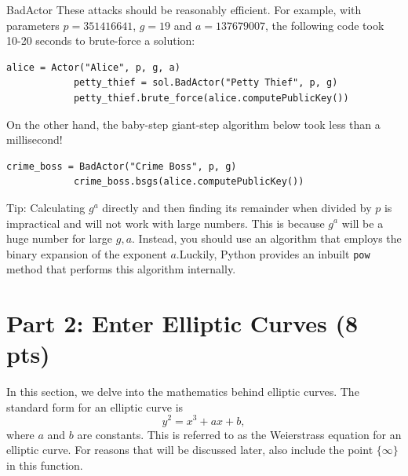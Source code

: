 \documentclass{article}
\begin{document}
\begin{tcolorbox}[enhanced,interior style={top color=Plum!20,bottom color=Plum!30}]
\begin{mybox}[
            colframe=purple!50!black,
            colback=purple!30,
            colbacktitle=purple!50!white,
            coltitle=purple!30!black,
            ]{BadActor}
        These attacks should be reasonably efficient. For example, with parameters $p = 351416641$, $g = 19$ and $a = 137679007$, the following code took 10-20 seconds to brute-force a solution:
        \begin{lstlisting}[belowskip=-6pt]
            alice = Actor("Alice", p, g, a)
            petty_thief = sol.BadActor("Petty Thief", p, g)
            petty_thief.brute_force(alice.computePublicKey())
        \end{lstlisting}
        On the other hand, the baby-step giant-step algorithm below took less than a millisecond!
        \begin{lstlisting}[belowskip=-10pt]
            crime_boss = BadActor("Crime Boss", p, g)
            crime_boss.bsgs(alice.computePublicKey())
        \end{lstlisting}
        
        \end{mybox}
    
        \vspace{2mm}
        Tip: Calculating $g^{a}$ directly and then finding its remainder when divided by $p$ is impractical and will not work with large numbers. This is because $g^{a}$ will be a huge number for large $g, a$. Instead, you should use an algorithm that employs the binary expansion of the exponent $a$.\footnotemark Luckily, Python provides an inbuilt \lstinline{pow} method that performs this algorithm internally.
    \end{tcolorbox}

\section*{Part 2: Enter Elliptic Curves (8 pts)}
    In this section, we delve into the mathematics behind elliptic curves. The standard form for an elliptic curve is $$y^{2} = x^{3} + ax + b,$$ where $a$ and $b$ are constants. This is referred to as the Weierstrass equation for an elliptic curve. For reasons that will be discussed later, also include the point $\{\infty\}$ in this function.
\end{document}
